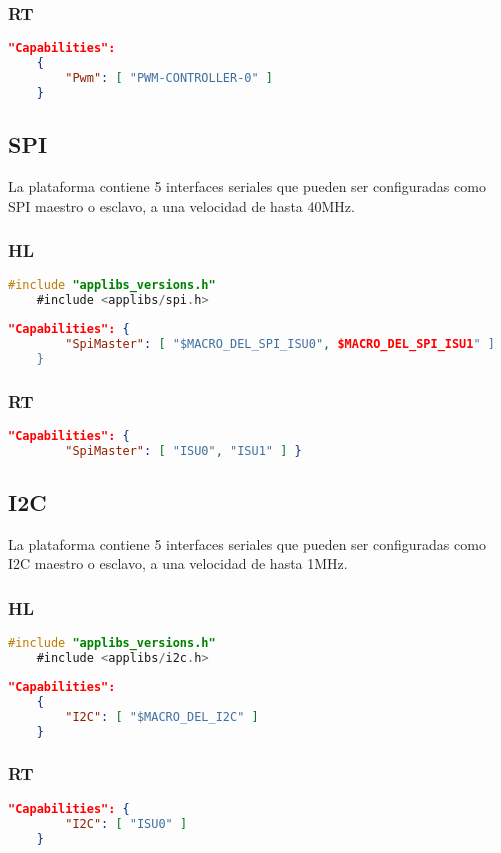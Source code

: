 \subsubsection{RT}
\begin{lstlisting}[language = json, firstnumber=0]	
	"Capabilities": 
	{  
		"Pwm": [ "PWM-CONTROLLER-0" ] 
	}
\end{lstlisting}

\subsection{SPI}
La plataforma contiene 5 interfaces seriales que pueden ser configuradas como SPI maestro o esclavo, a una velocidad de hasta 40MHz.
\subsubsection{HL}
\begin{lstlisting}[language = C, firstnumber=0]
	#include "applibs_versions.h"
	#include <applibs/spi.h>
\end{lstlisting}
\begin{lstlisting}[language = json, firstnumber=0]	
	"Capabilities": {  
		"SpiMaster": [ "$MACRO_DEL_SPI_ISU0", $MACRO_DEL_SPI_ISU1" ]
	}
\end{lstlisting}
\subsubsection{RT}
\begin{lstlisting}[language = json, firstnumber=0]	
	"Capabilities": {
		"SpiMaster": [ "ISU0", "ISU1" ] }
\end{lstlisting}

\subsection{I2C}
La plataforma contiene 5 interfaces seriales que pueden ser configuradas como I2C maestro o esclavo, a una velocidad de hasta 1MHz.
\subsubsection{HL}
\begin{lstlisting}[language = C, firstnumber=0]
	#include "applibs_versions.h"
	#include <applibs/i2c.h>
\end{lstlisting}
\begin{lstlisting}[language = json, firstnumber=0]		"Capabilities":
	{  
		"I2C": [ "$MACRO_DEL_I2C" ] 
	}
\end{lstlisting}
\subsubsection{RT}
\begin{lstlisting}[language = json, firstnumber=0]	
	"Capabilities": {
		"I2C": [ "ISU0" ]
	}
\end{lstlisting}
